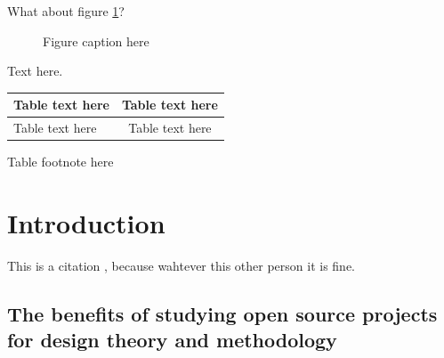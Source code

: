 \documentclass{ICED-Paper}%
\begin{document}

What about figure \ref{fig1}?

\begin{figure}
\caption{Figure caption here\label{fig1}}
\end{figure}

Text here.

\begin{table}
{\tabcolsep=2pc\begin{tabular}{|l|c|}%
\hline
Table text here & Table text here\\%
\hline
Table text here & Table text here\\%
\hline
\end{tabular}}{Table footnote here}
\end{table}

\section{Introduction}

This is a citation \cite{cite_key1}, because wahtever this other person \cite{cite_key2} it is fine.

\subsection{The benefits of studying open source projects for design theory and methodology}
\end{document}

